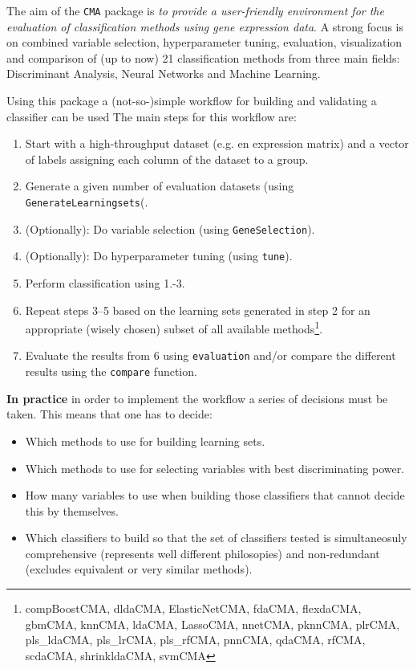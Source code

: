 \documentclass{article}\usepackage[]{graphicx}\usepackage[]{color}
\begin{document}
The aim of the \texttt{CMA} package is \emph{to provide a
user-friendly environment for the evaluation of classification methods using gene expression data}. A strong focus is on combined variable
selection, hyperparameter tuning, evaluation, visualization and
comparison of (up to now) 21 classification methods from three main
fields: Discriminant Analysis, Neural Networks and Machine Learning.

Using this package a (not-so-)simple workflow for building and validating a classifier can be used
The main steps for this workflow are: 
\begin{enumerate}
\item Start with a high-throughput dataset (e.g. en expression matrix) and a vector of labels assigning each column of the dataset to a group.
\item 
Generate a given number of evaluation datasets (using \texttt{GenerateLearningsets}(.
\item 
(Optionally): Do variable selection (using \texttt{GeneSelection}).
\item 
(Optionally): Do hyperparameter tuning (using \texttt{tune}).
\item 
Perform classification using 1.-3.
\item 
Repeat steps 3--5 based on the learning sets generated in step 2 for an appropriate (wisely chosen) subset of all available methods\footnote{compBoostCMA, dldaCMA, ElasticNetCMA, fdaCMA, flexdaCMA, gbmCMA, knnCMA, ldaCMA, LassoCMA, nnetCMA, pknnCMA, plrCMA, pls_ldaCMA, pls_lrCMA, pls_rfCMA, pnnCMA, qdaCMA, rfCMA, scdaCMA, shrinkldaCMA, svmCMA}.
\item Evaluate the results from 6 using \texttt{evaluation} and/or compare the different results using the \texttt{compare} function.
\end{enumerate}

\textbf{In practice} in order to implement the workflow a series of decisions must be taken. This means that one has to decide:
\begin{itemize}
\item Which methods to use for building learning sets.
\item Which methods to use for selecting variables with best discriminating power.
\item How many variables to use when building those classifiers that cannot decide this by themselves.
\item Which classifiers to build so that the set of classifiers tested is simultaneosuly comprehensive (represents well different philosopies) and non-redundant (excludes equivalent or very similar methods).
\end{itemize}
\end{document}

